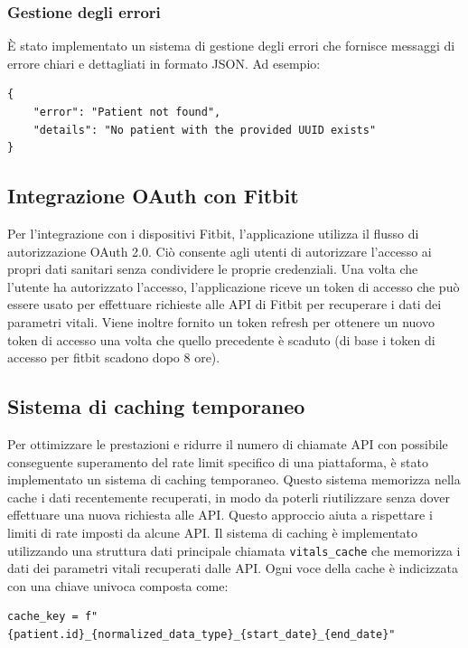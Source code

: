 \documentclass[12pt,a4paper,oneside]{report}
\begin{document}
\subsubsection{Gestione degli errori}
È stato implementato un sistema di gestione degli errori che fornisce messaggi di errore chiari e dettagliati in formato JSON. Ad esempio:

\begin{verbatim}
{
    "error": "Patient not found",
    "details": "No patient with the provided UUID exists"
}
\end{verbatim}

\subsection{Integrazione OAuth con Fitbit}
Per l'integrazione con i dispositivi Fitbit, l'applicazione utilizza il flusso di autorizzazione OAuth 2.0.
Ciò consente agli utenti di autorizzare l'accesso ai propri dati sanitari senza condividere le proprie credenziali.
Una volta che l'utente ha autorizzato l'accesso, l'applicazione riceve un token di accesso che può essere usato per effettuare richieste alle API di Fitbit per recuperare i dati dei parametri vitali. Viene inoltre fornito un token refresh per ottenere un nuovo token di accesso una volta che quello precedente è scaduto (di base i token di accesso per fitbit scadono dopo 8 ore).

\subsection{Sistema di caching temporaneo}
Per ottimizzare le prestazioni e ridurre il numero di chiamate API con possibile conseguente superamento del rate limit specifico di una piattaforma, è stato implementato un sistema di caching temporaneo. Questo sistema memorizza nella cache i dati recentemente recuperati, in modo da poterli riutilizzare senza dover effettuare una nuova richiesta alle API. Questo approccio aiuta a rispettare i limiti di rate imposti da alcune API.
Il sistema di caching è implementato utilizzando una struttura dati principale chiamata \texttt{vitals\_cache} che memorizza i dati dei parametri vitali recuperati dalle API.
Ogni voce della cache è indicizzata con una chiave univoca composta come:
\begin{lstlisting}[basicstyle=\small\ttfamily, breaklines=true]
cache_key = f"{patient.id}_{normalized_data_type}_{start_date}_{end_date}"
\end{lstlisting}
\end{document}

